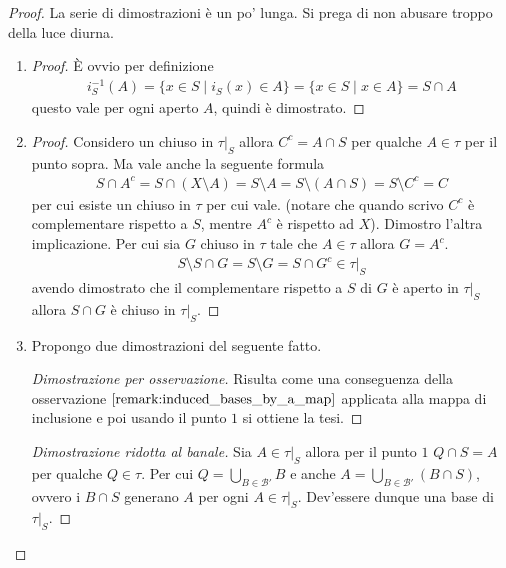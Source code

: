 \begin{proof}
	La serie di dimostrazioni è un po' lunga. Si prega di non abusare troppo della luce diurna.
\begin{enumerate}
	\item \begin{proof}
		È ovvio per definizione
		\begin{equation}
		\begin{aligned}
			i^{-1}_S(A) = \{x \in S \; | \; i_S(x) \in A \} = \{x \in S \; | \; x \in A\} = S \cap A
		\end{aligned}
		\end{equation}
		questo vale per ogni aperto $A$, quindi è dimostrato.
	\end{proof}
	\item 
	\begin{proof}
		Considero un chiuso in $\tau|_S$ allora $C^c = A \cap S$ per qualche $A \in \tau$ per il punto sopra. Ma vale anche la seguente formula
		\begin{equation}
		\begin{aligned}
			S \cap A^c = S \cap (X \setminus A) = S \setminus A = S \setminus (A \cap S) = S \setminus C^c = C 
		\end{aligned}
		\end{equation}
		per cui esiste un chiuso in $\tau$ per cui vale. (notare che quando scrivo $C^c$ è complementare rispetto a $S$, mentre $A^c$ è rispetto ad $X$).
		Dimostro l'altra implicazione. Per cui sia $G$ chiuso in $\tau$ tale che $A \in \tau$ allora $G = A^c$.
		\begin{equation}
		\begin{aligned}
			S \setminus S \cap G = S \setminus G = S \cap G^c \in \tau|_S 
		\end{aligned}
		\end{equation}  
		avendo dimostrato che il complementare rispetto a $S$ di $G$ è aperto in $\tau|_S$ allora $S \cap G$ è chiuso in $\tau|_S$. 
	\end{proof}
	\item Propongo due dimostrazioni del seguente fatto.
	\begin{proof}[Dimostrazione per osservazione]
		Risulta come una conseguenza della osservazione $\ref{remark:induced_bases_by_a_map}$ applicata alla mappa di inclusione e poi usando il punto $1$ si ottiene la tesi.
	\end{proof}
	\begin{proof}[Dimostrazione ridotta al banale]
		Sia $A \in \tau|_S$ allora per il punto $1$ $Q \cap S = A$ per qualche $Q \in \tau$. Per cui $Q = \bigcup_{B \in \mathcal{B}'} B$ e anche $A = \bigcup_{B \in \mathcal{B}'} (B \cap S)$, ovvero i $B \cap S$ generano $A$ per ogni $A \in \tau|_S$. Dev'essere dunque una base di $\tau|_S$. 

\end{proof}
\end{enumerate}
\end{proof}
